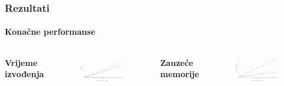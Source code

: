 \documentclass{beamer}
\begin{document}
    \begin{frame}
        \frametitle{Rezultati}
        \framesubtitle{Konačne performanse}

        \begin{columns}[c]

        \center \textbf{Vrijeme izvođenja}
        \begin{figure}[h!]
            \begin{center}
                \includegraphics[width=\columnwidth]{timeGraph.png}
            \end{center}
        \end{figure}

        \center \textbf{Zauzeće memorije}
        \begin{figure}[h!]
            \begin{center}
                \includegraphics[width=\columnwidth]{memoryGraph.png}
            \end{center}
        \end{figure}

        \end{columns}
    \end{frame}
\end{document}
